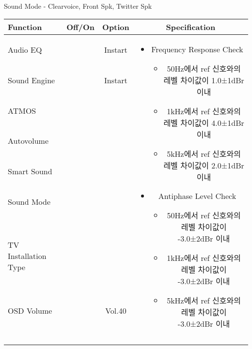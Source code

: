 \begin{frame}[t]{Sound Mode - Clearvoice, Front Spk, Twitter Spk}
\begin{tiny}
\begin{tabular}{@{}lccc@{}}
\toprule
Function & Off/On & Option & Specification \\
\midrule
Audio EQ & \color{black}{Off} & Instart &
\multirow{10}{60mm}{
\begin{itemize}
	\item Frequency Response Check
	\begin{itemize}
		\item 50Hz에서 ref 신호와의 레벨 차이값이 1.0±1dBr 이내
		\item 1kHz에서 ref 신호와의 레벨 차이값이 4.0±1dBr 이내
		\item 5kHz에서 ref 신호와의 레벨 차이값이 2.0±1dBr 이내	
	\end{itemize}
	\item Antiphase Level Check
	\begin{itemize}
		\item 50Hz에서 ref 신호와의 레벨 차이값이 -3.0±2dBr 이내
		\item 1kHz에서 ref 신호와의 레벨 차이값이 -3.0±2dBr 이내
		\item 5kHz에서 ref 신호와의 레벨 차이값이 -3.0±2dBr 이내
	\end{itemize}	
\end{itemize}
} \\
Sound Engine & \color{blue}{On} & Instart & \\
ATMOS & \color{black}{Off}  & & \\
Autovolume & \color{black}{Off} & & \\
Smart Sound & \color{black}{Off} & & \\
Sound Mode & \color{blue}{On} & \color{blue}{Clearvoice} & \\
TV Installation Type & \color{blue}{On} & \color{black}{Standtype1} & \\
OSD Volume & \color{blue}{On} & Vol.40 & \\
& & & \\
& & & \\
& & & \\
& & & \\\midrule
\end{tabular}
\end{tiny}


\end{frame}


